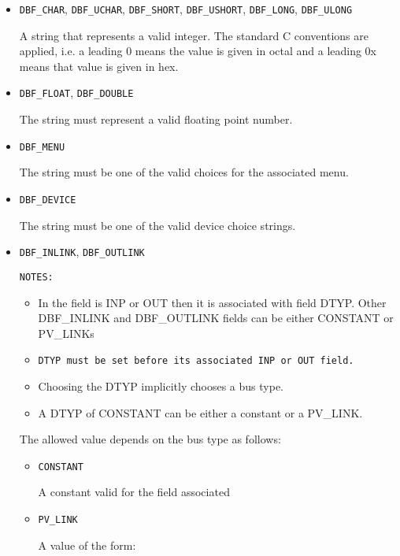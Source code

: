 \begin{itemize}
\begin{itemize}
\item \verb|DBF_CHAR|, \verb|DBF_UCHAR|, \verb|DBF_SHORT|, \verb|DBF_USHORT|, \verb|DBF_LONG|, \verb|DBF_ULONG|

A string that represents a valid integer. The standard C conventions are applied, i.e. a leading 0 means the 
value is given in octal and a leading 0x means that value is given in hex.

\item \verb|DBF_FLOAT|, \verb|DBF_DOUBLE|

The string must represent a valid floating point number.

\item \verb|DBF_MENU|

The string must be one of the valid choices for the associated menu.

\item \verb|DBF_DEVICE|

The string must be one of the valid device choice strings.

\item \verb|DBF_INLINK|, \verb|DBF_OUTLINK|

\verb|NOTES:|

\begin{itemize}
\item In the field is INP or OUT then it is associated with field DTYP. Other DBF\_INLINK and 
DBF\_OUTLINK fields can be either CONSTANT or PV\_LINKs

\item \verb|DTYP must be set before its associated INP or OUT field.|

\item Choosing the DTYP implicitly chooses a bus type.

\item A DTYP of CONSTANT can be either a constant or a PV\_LINK.

\end{itemize}

The allowed value depends on the bus type as follows:

\begin{itemize}

\item \verb|CONSTANT|

A constant valid for the field associated 

\item {}\verb|PV_LINK|

A value of the form:




\end{itemize}
\end{itemize}
\end{itemize}
